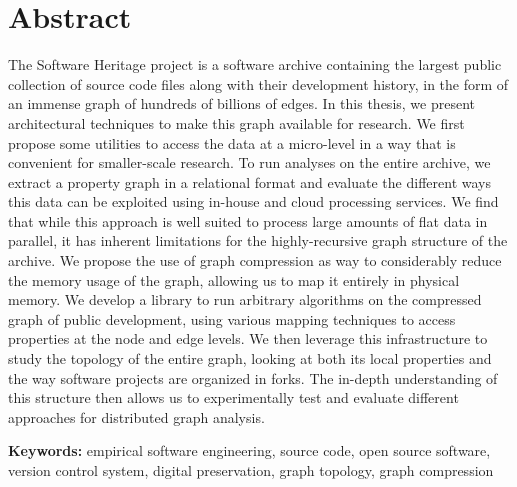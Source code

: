 \begin{minipage}[t][0.5\textheight][t]{\textwidth}

\section*{Abstract}
\begin{SingleSpace}
    The Software Heritage project is a software archive containing the largest
    public collection of source code files along with their development history,
    in the form of an immense graph of hundreds of billions of edges. In this
    thesis, we present architectural techniques to make this graph available
    for research. We first propose some utilities to access the data at a
    micro-level in a way that is convenient for smaller-scale research.
    To run analyses on the entire archive, we extract a property graph in a
    relational format and evaluate the different ways this data can be
    exploited using in-house and cloud processing services.
    We find that while this approach is well suited to process large amounts of
    flat data in parallel, it has inherent limitations for the highly-recursive
    graph structure of the archive. We propose the use of graph compression as
    way to considerably reduce the memory usage of the graph, allowing us to
    map it entirely in physical memory. We develop a library to run arbitrary
    algorithms on the compressed graph of public development, using various
    mapping techniques to access properties at the node and edge levels.
    We then leverage this infrastructure to study the topology of the entire
    graph, looking at both its local properties and the way software projects
    are organized in forks. The in-depth understanding of this structure then
    allows us to experimentally test and evaluate different approaches for
    distributed graph analysis.

\vspace{3mm}

\textbf{Keywords:} empirical software engineering, source code, open source
software, version control system, digital preservation, graph topology, graph
compression

\end{SingleSpace}
\end{minipage} \\


